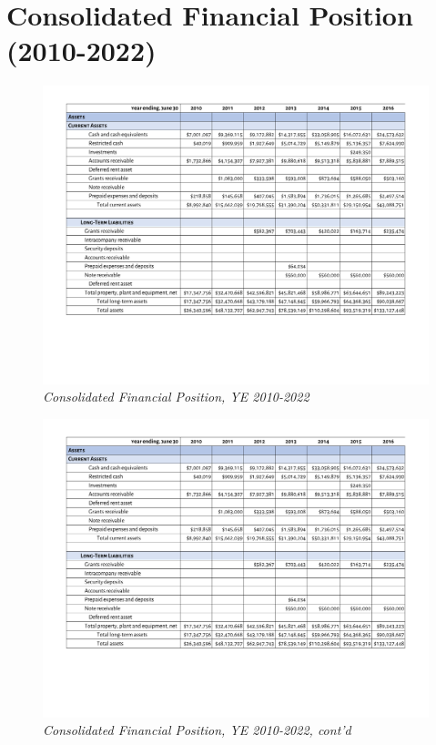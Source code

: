 
\chapter{Consolidated Financial Position (2010-2022)}\label{ch:consolidated_financial_position}\noindent

\begin{figure}
  \caption[Consolidated Financial Position, Years Ending 2010–2022]{\textit{Consolidated Financial Position, YE 2010-2022}}\label{fig:consolidated_financial_position}
  \includegraphics[page=1,scale=0.8]{Consolidated_Financial_Position_2010-2022} %
\end{figure}

\begin{figure}
  \caption*{\textit{Consolidated Financial Position, YE 2010-2022, cont'd}}
  \includegraphics[page=2,scale=0.8]{Consolidated_Financial_Position_2010-2022} %
\end{figure}

